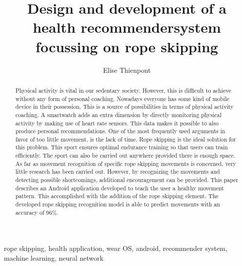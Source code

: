 \documentclass[twocolumn]{phdsymp} %
\begin{document}
\title{Design and development of a health recommendersystem focussing on rope skipping} %

\author{Elise Thienpont}



\maketitle

\begin{abstract}
Physical activity is vital in our sedentary society. However, this is difficult to achieve without any form of personal coaching. Nowadays everyone has some kind of mobile device in their possession. This is a source of possibilities in terms of physical activity coaching. A smartwatch adds an extra dimension by directly monitoring physical activity by making use of heart rate sensors. This data makes it possible to also produce personal recommendations.
One of the most frequently used arguments in favor of too little movement, is the lack of time. Rope skipping is the ideal solution for this problem. This sport ensures optimal endurance training so that users can train efficiently. The sport can also be carried out anywhere provided there is enough space. As far as movement recognition of specific rope skipping movements is concerned, very little research has been carried out. However, by recognizing the movements and detecting possible shortcomings, additional encouragement can be provided.
This paper describes an Android application developed to teach the user a healthy movement pattern. This accomplished with the addition of the rope skipping element.
The developed rope skipping recognition model is able to predict movements with an accuracy of 96\%.
\end{abstract}

\begin{keywords} rope skipping, health application, wear OS, android, recommender system, machine learning, neural network
\end{keywords}
\end{document}
